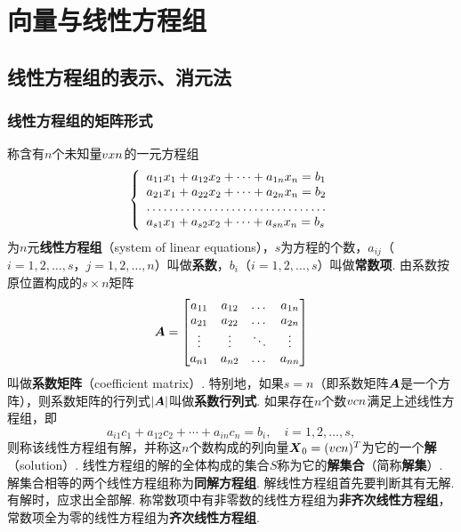 \chapter{向量与线性方程组}
\section{线性方程组的表示、消元法}
\subsection{线性方程组的矩阵形式}
\begin{definition}
称含有\(n\)个未知量\(v{x}{n}\)的一元方程组\[
\left\{ \begin{array}{l}
a_{11} x_1 + a_{12} x_2 + \dotsb + a_{1n} x_n = b_1 \\
a_{21} x_1 + a_{22} x_2 + \dotsb + a_{2n} x_n = b_2 \\
\hdotsfor{1} \\
a_{s1} x_1 + a_{s2} x_2 + \dotsb + a_{sn} x_n = b_s
\end{array} \right.
\]为\(n\)元\textbf{线性方程组}（system of linear equations），\(s\)为方程的个数，\(a_{ij}\)（\(i=1,2,\dotsc,s\)，\(j=1,2,\dotsc,n\)）叫做\textbf{系数}，\(b_i\)（\(i=1,2,\dotsc,s\)）叫做\textbf{常数项}.
由系数按原位置构成的\(s \times n\)矩阵\[
\boldsymbol{A} = \begin{bmatrix}
a_{11} & a_{12} & \dots & a_{1n} \\
a_{21} & a_{22} & \dots & a_{2n} \\
\vdots & \vdots & \ddots & \vdots \\
a_{n1} & a_{n2} & \dots & a_{nn}
\end{bmatrix}
\]叫做\textbf{系数矩阵}（coefficient matrix）.
特别地，如果\(s = n\)（即系数矩阵\(\boldsymbol{A}\)是一个方阵），则系数矩阵的行列式\(\abs{\boldsymbol{A}}\)叫做\textbf{系数行列式}.
如果存在\(n\)个数\(v{c}{n}\)满足上述线性方程组，即\[
a_{i1}c_1 + a_{12}c_2 + \dotsb + a_{in}c_n = b_i,
\quad
i=1,2,\dotsc,s,
\]则称该线性方程组有解，并称这\(n\)个数构成的列向量\(\boldsymbol{X}_0 = (v{c}{n})^T\)为它的一个\textbf{解}（solution）.
线性方程组的解的全体构成的集合\(S\)称为它的\textbf{解集合}（简称\textbf{解集}）.
解集合相等的两个线性方程组称为\textbf{同解方程组}.
解线性方程组首先要判断其有无解.有解时，应求出全部解.
称常数项中有非零数的线性方程组为\textbf{非齐次线性方程组}，常数项全为零的线性方程组为\textbf{齐次线性方程组}.


\end{definition}
